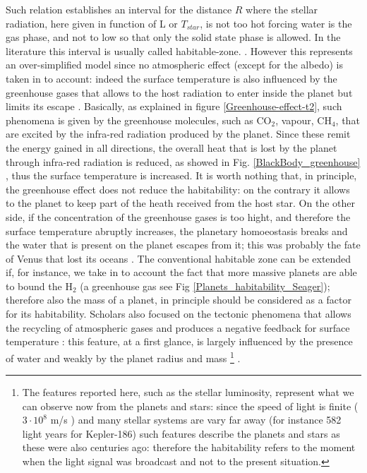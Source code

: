 \documentclass[
12pt, %
a4paper, %
oneside, %
headinclude,footinclude, %
BCOR5mm, %
]{scrartcl}
\begin{document}
Such relation establishes an interval for the distance $R$ where the stellar radiation, here given in function of L or $T_{star}$, is not too hot forcing water is the gas phase, and not to low so that only the solid state phase is allowed. In the literature this interval is usually called habitable-zone. \cite{kasting1993habitable}. However this represents an over-simplified model since no atmospheric effect (except for the albedo) is taken in to account: indeed the surface temperature is also influenced by the greenhouse gases that allows to the host radiation to enter inside the planet but limits its escape \cite{seager2013exoplanet,forget2014possible}. Basically, as explained in figure \ref{Greenhouse-effect-t2},  such phenomena is given by the greenhouse molecules, such as CO$_{2}$, vapour, CH$_{4}$, that are excited by the infra-red radiation produced by the planet. Since these remit the energy gained in all directions, the overall heat that is lost by the planet through infra-red radiation is reduced, as showed in Fig. \ref{BlackBody_greenhouse} \cite{pierrehumbert2011infrared}, thus the surface temperature is increased. It is worth nothing that, in principle, the greenhouse effect does not reduce the habitability: on the contrary it allows to the planet to keep part of the heath received from the host star. On the other side, if the concentration of the greenhouse gases is too hight, and therefore the surface temperature abruptly increases, the planetary homoeostasis  \cite{lovelock1974atmospheric,lovelock1982life,caldeira1992life} breaks and the water that is present on the planet escapes from it; this was probably the fate of Venus that lost its oceans \cite{way2016venus,luger2015extreme,seager2013exoplanet}. The conventional habitable zone can be extended if, for instance, we take in to account the fact that more massive planets are able to bound the H$_{2}$ (a greenhouse gas see Fig \ref{Planets_habitability_Seager}); therefore also the mass of a planet, in principle should be considered as a factor for its habitability. Scholars \cite{tackley2012habitable} also focused on the tectonic phenomena that allows the recycling of atmospheric gases and produces a negative feedback for surface temperature \cite{walker1981negative}: this feature, at a first glance, is largely influenced by the presence of water \cite{korenaga2010likelihood,o2007geological} and weakly by the planet radius \cite{o2007geological} and mass \cite{korenaga2010likelihood}\footnote{The features reported here, such as the stellar luminosity, represent what we can observe now from the planets and stars: since the speed of light is finite ($3\cdot10^{8}$ m/s ) and many stellar systems are vary far away (for instance 582 light years for Kepler-186) such features describe the planets and stars as these were also centuries ago: therefore the habitability refers to the moment when the light signal was broadcast and not to the present situation.} .  
  
\end{document}
